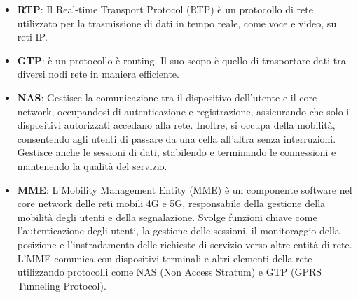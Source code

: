 \documentclass[english]{article}
\begin{document}
\begin{itemize}
	\item \textbf{\hypertarget{RTP}{RTP}}: Il Real-time Transport Protocol (RTP) è un protocollo
	      di rete utilizzato per la trasmissione di dati in tempo reale, come voce e video, su reti IP.\@

	\item \textbf{\hypertarget{GTP}{GTP}}: è un protocollo è routing. Il suo scopo è quello di trasportare dati tra
	      diversi nodi rete in maniera efficiente.

	\item \textbf{\hypertarget{NAS}{NAS}}: Gestisce la comunicazione tra il dispositivo dell'utente e il
	      core network, occupandosi di autenticazione e registrazione, assicurando che solo i dispositivi
	      autorizzati accedano alla rete. Inoltre, si occupa della mobilità, consentendo agli utenti di
	      passare da una cella all'altra senza interruzioni. Gestisce anche le sessioni di dati, stabilendo
	      e terminando le connessioni e mantenendo la qualità del servizio.

	\item \textbf{\hypertarget{MME}{MME}}: L'Mobility Management Entity (MME) è un componente software nel
	      core network delle reti mobili 4G e 5G, responsabile della gestione della mobilità degli utenti
	      e della segnalazione. Svolge funzioni chiave come l'autenticazione degli utenti, la gestione
	      delle sessioni,
	      il monitoraggio della posizione e l'instradamento delle richieste di servizio verso
	      altre entità di rete. L'MME comunica con dispositivi terminali e altri elementi
	      della rete utilizzando protocolli come NAS (Non Access Stratum) e
	      GTP (GPRS Tunneling Protocol).
\end{itemize}
\clearpage
\printbibliography
\end{document}
